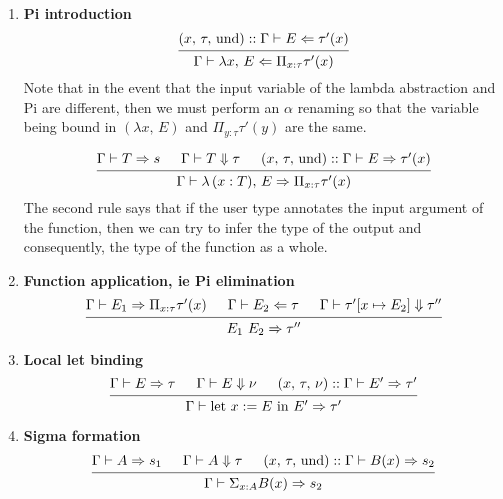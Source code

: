 \documentclass{article}
\begin{document}
\begin{enumerate}
\item \textbf{Pi introduction} \\
  \[
    \begin{prooftree}
      \hypo{(x, \, \tau, \, \text{und}) :: \Gamma \vdash E \Leftarrow \tau'(x)}
      \infer1{\Gamma \vdash \lambda x, \, E \Leftarrow \Pi_{x : \tau}\tau'(x)}
    \end{prooftree}
  \]
  Note that in the event that the input variable of the lambda abstraction and
  Pi are different, then we must perform an $\alpha$ renaming so that the
  variable being bound in $(\lambda x, \, E)$ and $\Pi_{y : \tau} \tau'(y)$
  are the same.

  \[
    \begin{prooftree}
      \hypo{\Gamma \vdash T \Rightarrow s}
      \hypo{\Gamma \vdash T \Downarrow \tau}
      \hypo{(x, \, \tau, \, \text{und}) :: \Gamma \vdash E \Rightarrow \tau'(x)}
      \infer3{\Gamma \vdash \lambda \, (x : T), \, E \Rightarrow \Pi_{x : \tau}\tau'(x)}
    \end{prooftree}
  \]
  The second rule says that if the user type annotates the input argument of
  the function, then we can try to infer the type of the output and
  consequently, the type of the function as a whole.

\item \textbf{Function application, ie Pi elimination} \\
  \[
    \begin{prooftree}
      \hypo{\Gamma \vdash E_1 \Rightarrow \Pi_{x : \tau}\tau'(x)}
      \hypo{\Gamma \vdash E_2 \Leftarrow \tau}
      \hypo{\Gamma \vdash \tau'[x \mapsto E_2] \Downarrow \tau''}
      \infer3{E_1 \,\, E_2 \Rightarrow \tau''}
    \end{prooftree}
  \]

\item \textbf{Local let binding} \\
  \[
    \begin{prooftree}
      \hypo{\Gamma \vdash E \Rightarrow \tau}
      \hypo{\Gamma \vdash E \Downarrow \nu}
      \hypo{(x, \, \tau, \, \nu) :: \Gamma \vdash E' \Rightarrow \tau'}
      \infer3{\Gamma \vdash \text{let } x := E \text{ in } E' \Rightarrow \tau'}
    \end{prooftree}
  \]

\item \textbf{Sigma formation} \\
  \[
    \begin{prooftree}
      \hypo{\Gamma \vdash A \Rightarrow s_1}
      \hypo{\Gamma \vdash A \Downarrow \tau}
      \hypo{(x, \, \tau, \, \text{und}) :: \Gamma \vdash B(x) \Rightarrow s_2}
      \infer3{\Gamma \vdash \Sigma_{x : A}B(x) \Rightarrow s_2}
    \end{prooftree}
  \]


\end{enumerate}
\end{document}
